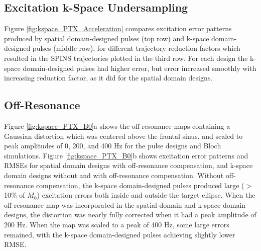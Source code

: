 \subsection*{Excitation k-Space Undersampling}
Figure \ref{fig:kspace_PTX_Acceleration} compares excitation error patterns produced by spatial domain-designed pulses (top row)
and k-space domain-designed pulses (middle row),
for different trajectory reduction factors which resulted in the SPINS trajectories plotted in the third row. 
For each design the k-space domain-designed pulses had higher error, 
but error increased smoothly with increasing reduction factor, 
as it did for the spatial domain designs. 




\subsection*{Off-Resonance}
Figure \ref{fig:kspace_PTX_B0}a shows the off-resonance maps containing a Gaussian distortion which was centered above the frontal sinus,
and scaled to peak amplitudes of 0, 200, and 400 Hz for the pulse designs and Bloch simulations. 
Figure \ref{fig:kspace_PTX_B0}b shows excitation error patterns and RMSEs for spatial domain designs with off-resonance compensation,
and k-space domain designs without and with off-resonance compensation. 
Without off-resonance compensation, 
the k-space domain-designed pulses produced large ($>$ 10\% of $M_0$) excitation errors both inside and outside the target ellipse. 
When the off-resonance map was incorporated in the spatial domain and k-space domain designs, 
the distortion was nearly fully corrected when it had a peak amplitude of 200 Hz. 
When the map was scaled to a peak of 400 Hz, some large errors remained, with the k-space domain-designed pulses achieving slightly lower RMSE. 
